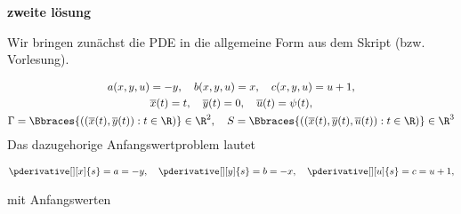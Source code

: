 
\textbf{zweite lösung}

\begin{solution}
	Wir bringen zunächst die PDE in die allgemeine Form aus dem Skript (bzw. Vorlesung).
	
	\begin{gather*}
	a(x, y, u) = -y,
	\quad
	b(x, y, u) = x,
	\quad
	c(x, y, u) = u + 1, \\
	\overline{x}(t) = t,
	\quad
	\overline{y}(t) = 0,
	\quad
	\overline{u}(t) = \psi(t), \\
	\Gamma = \Bbraces
	{
		(
		(
		\overline{x}(t),
		\overline{y}(t)
		):
		t \in \R
		)
	} \in \R^2,
	\quad
	S = \Bbraces
	{
		(
		(
		\overline{x}(t),
		\overline{y}(t),
		\overline{u}(t)
		):
		t \in \R
		)
	} \in \R^3
	\end{gather*}
	Das dazugehorige Anfangswertproblem lautet
	
	\begin{align*}
	\pderivative[][x]{s} = a = -y, \quad
	\pderivative[][y]{s} = b = -x, \quad
	\pderivative[][u]{s} = c = u + 1,
	\end{align*}
	
	mit Anfangswerten
	

\end{solution}
